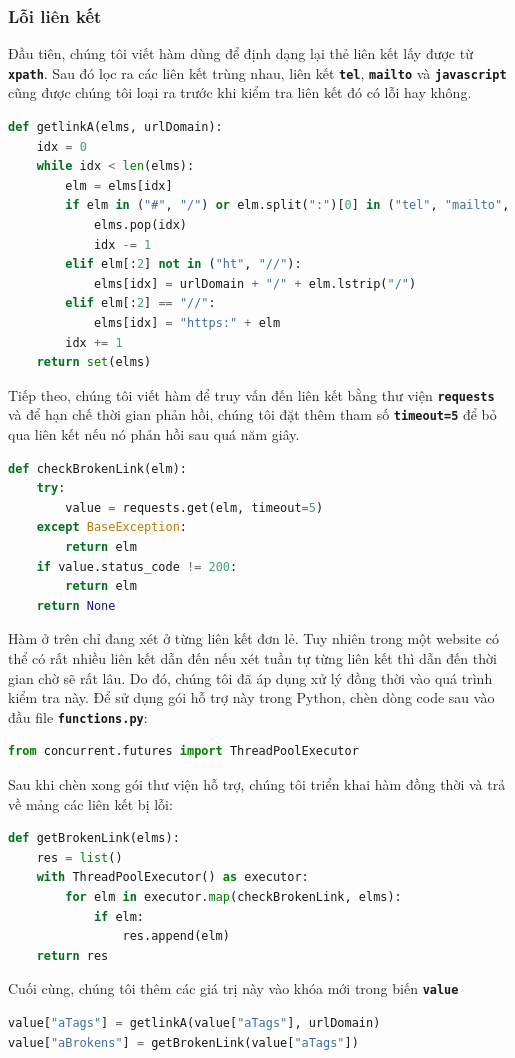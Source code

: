 \subsubsection{Lỗi liên kết}
Đầu tiên, chúng tôi viết hàm dùng để định dạng lại thẻ liên kết lấy được từ \textbf{\texttt{xpath}}. Sau đó lọc ra các liên kết trùng nhau, liên kết \textbf{\texttt{tel}}, \textbf{\texttt{mailto}} và \textbf{\texttt{javascript}} cũng được chúng tôi loại ra trước khi kiểm tra liên kết đó có lỗi hay không.
\begin{lstlisting}[language=Python]
def getlinkA(elms, urlDomain):
    idx = 0
    while idx < len(elms):
        elm = elms[idx]
        if elm in ("#", "/") or elm.split(":")[0] in ("tel", "mailto", "javascript"):
            elms.pop(idx)
            idx -= 1
        elif elm[:2] not in ("ht", "//"):
            elms[idx] = urlDomain + "/" + elm.lstrip("/")
        elif elm[:2] == "//":
            elms[idx] = "https:" + elm
        idx += 1
    return set(elms)
\end{lstlisting}
\par
Tiếp theo, chúng tôi viết hàm để truy vấn đến liên kết bằng thư viện \textbf{\texttt{requests}} và để hạn chế thời gian phản hồi, chúng tôi đặt thêm tham số \textbf{\texttt{timeout=5}} để bỏ qua liên kết nếu nó phản hồi sau quá năm giây.
\begin{lstlisting}[language=Python]
def checkBrokenLink(elm):
    try:
        value = requests.get(elm, timeout=5)
    except BaseException:
        return elm
    if value.status_code != 200:
        return elm
    return None
\end{lstlisting}
Hàm ở trên chỉ đang xét ở từng liên kết đơn lẻ. Tuy nhiên trong một website có thể có rất nhiều liên kết dẫn đến nếu xét tuần tự từng liên kết thì dẫn đến thời gian chờ sẽ rất lâu. Do đó, chúng tôi đã áp dụng xử lý đồng thời vào quá trình kiểm tra này. Để sử dụng gói hỗ trợ này trong Python, chèn dòng code sau vào đầu file \textbf{\texttt{functions.py}}:
\begin{lstlisting}[language=Python]
from concurrent.futures import ThreadPoolExecutor 
\end{lstlisting}
\par
Sau khi chèn xong gói thư viện hỗ trợ, chúng tôi triển khai hàm đồng thời và trả về mảng các liên kết bị lỗi:
\begin{lstlisting}[language=Python]
def getBrokenLink(elms):
    res = list()
    with ThreadPoolExecutor() as executor:
        for elm in executor.map(checkBrokenLink, elms):
            if elm:
                res.append(elm)
    return res
\end{lstlisting}
\par
Cuối cùng, chúng tôi thêm các giá trị này vào khóa mới trong biến \textbf{\texttt{value}}
\begin{lstlisting}[language=Python]
value["aTags"] = getlinkA(value["aTags"], urlDomain)
value["aBrokens"] = getBrokenLink(value["aTags"])
\end{lstlisting}
